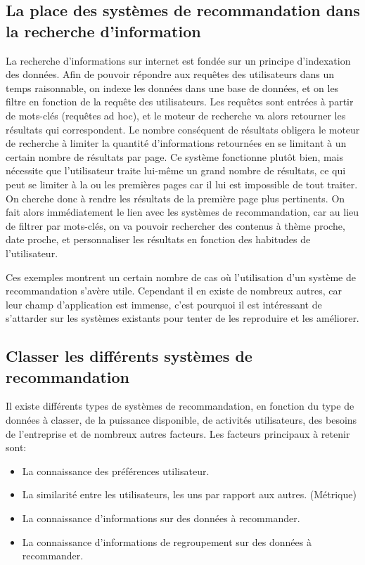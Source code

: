 \documentclass[11pt,a4paper]{report}
\begin{document}
\newpage
\subsection{La place des systèmes de recommandation dans la recherche d'information}

La recherche d'informations sur internet est fondée sur un principe d'indexation des données. Afin de pouvoir répondre aux requêtes des utilisateurs dans un temps raisonnable, on indexe les données dans une base de données, et on les filtre en fonction de la requête des utilisateurs. Les requêtes sont entrées à partir de mots-clés (requêtes ad hoc), et le moteur de recherche va alors retourner les résultats qui correspondent.
Le nombre conséquent de résultats obligera le moteur de recherche à limiter la quantité d'informations retournées en se limitant à un certain nombre de résultats par page.
Ce système fonctionne plutôt bien, mais nécessite que l'utilisateur traite lui-même un grand nombre de résultats, ce qui peut se limiter à la ou les premières pages car il lui est impossible de tout traiter.
On cherche donc à rendre les résultats de la première page plus pertinents. On fait alors immédiatement le lien avec les systèmes de recommandation, car au lieu de filtrer par mots-clés, on va pouvoir rechercher des contenus à thème proche, date proche, et personnaliser les résultats en fonction des habitudes de l'utilisateur.\par

Ces exemples montrent un certain nombre de cas où l'utilisation d'un système de recommandation s'avère utile. Cependant il en existe de nombreux autres, car leur champ d'application est immense, c'est pourquoi il est intéressant de s'attarder sur les systèmes existants pour tenter de les reproduire et les améliorer.


\newpage
\subsection{Classer les différents systèmes de recommandation}

Il existe différents types de systèmes de recommandation, en fonction du type de données à classer, de la puissance disponible, de activités utilisateurs, des besoins de l'entreprise et de nombreux autres facteurs.
Les facteurs principaux à retenir sont:
\begin{itemize}
	\item La connaissance des préférences utilisateur.
	\item La similarité entre les utilisateurs, les uns par rapport aux autres. (Métrique)
	\item La connaissance d'informations sur des données à recommander.
	\item La connaissance d'informations de regroupement sur des données à recommander.
\end{itemize}
\end{document}
